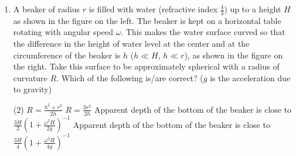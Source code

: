 
\begin{enumerate}
    \item A beaker of radius \(r\) is filled with water (refractive index \(\frac{4}{3}\)) up to a height \(H\) as shown in the figure on the left. The beaker is kept on a horizontal table rotating with angular speed \(\omega\). This makes the water surface curved so that the difference in the height of water level at the center and at the circumference of the beaker is \(h\) (\(h \ll H\), \(h \ll r\)), as shown in the figure on the right. Take this surface to be approximately spherical with a radius of curvature \(R\). Which of the following is/are correct? (\(g\) is the acceleration due to gravity)
        \begin{tasks}(2)
            \task \(R = \frac{h^2 + r^2}{2h}\)
            \task \(R = \frac{3r^2}{2h}\)
            \task Apparent depth of the bottom of the beaker is close to \(\frac{3H}{2} \left(1 + \frac{\omega^2H}{2g}\right)^{-1}\)
            \task Apparent depth of the bottom of the beaker is close to \(\frac{3H}{4} \left(1 + \frac{\omega^2H}{4g}\right)^{-1}\)
        \end{tasks}
\end{enumerate}
\begin{center}
\end{center}
